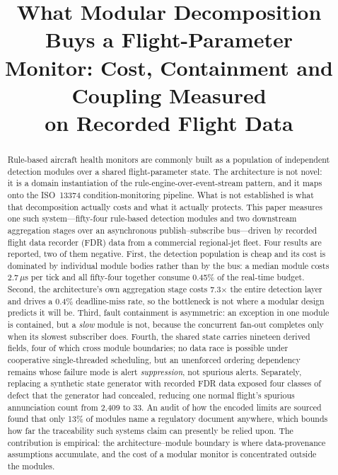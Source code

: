 \documentclass[conference]{IEEEtran}
\begin{document}
\title{What Modular Decomposition Buys a Flight-Parameter\\
Monitor: Cost, Containment and Coupling Measured\\
on Recorded Flight Data}

\author{
}

\maketitle

\begin{abstract}
Rule-based aircraft health monitors are commonly built as a population of
independent detection modules over a shared flight-parameter state. The
architecture is not novel: it is a domain instantiation of the
rule-engine-over-event-stream pattern, and it maps onto the ISO~13374
condition-monitoring pipeline. What is not established is what that
decomposition actually costs and what it actually protects. This paper
measures one such system---fifty-four rule-based detection modules and two
downstream aggregation stages over an asynchronous publish--subscribe
bus---driven by recorded flight data recorder (FDR) data from a commercial
regional-jet fleet. Four results are reported, two of them negative. First,
the detection population is cheap and its cost is dominated by individual
module bodies rather than by the bus: a median module costs
2.7\,$\mu$s per tick and all fifty-four together consume 0.45\% of the
real-time budget. Second, the architecture's own aggregation stage costs
7.3$\times$ the entire detection layer and drives a 0.4\% deadline-miss rate,
so the bottleneck is not where a modular design predicts it will be. Third,
fault containment is asymmetric: an exception in one module is contained, but
a \emph{slow} module is not, because the concurrent fan-out completes only
when its slowest subscriber does. Fourth, the shared state carries nineteen
derived fields, four of which cross module boundaries; no data race is
possible under cooperative single-threaded scheduling, but an unenforced
ordering dependency remains whose failure mode is alert \emph{suppression},
not spurious alerts. Separately, replacing a synthetic state generator with
recorded FDR data exposed four classes of defect that the generator had
concealed, reducing one normal flight's spurious annunciation count from
2{,}409 to 33. An audit of how the encoded limits are sourced found that only
13\% of modules name a regulatory document anywhere, which bounds how far the
traceability such systems claim can presently be relied upon. The contribution
is empirical: the architecture--module boundary is where data-provenance
assumptions accumulate, and the cost of a modular monitor is concentrated
outside the modules.
\end{abstract}
\end{document}
